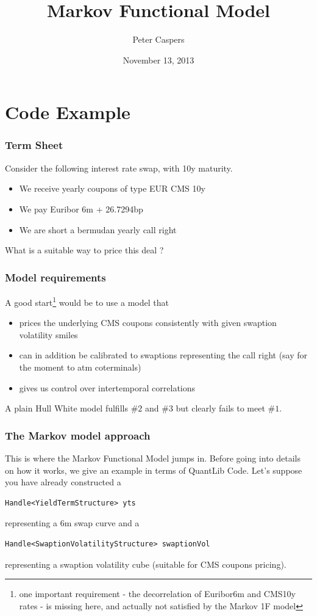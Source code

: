 \documentclass{beamer}
\begin{document}
\title{Markov Functional Model}  
\author{Peter Caspers}
\date{November 13, 2013} 

\frame{\titlepage} 


\section{Code Example}

\begin{frame}
\frametitle{Term Sheet}
Consider the following interest rate swap, with 10y maturity.
\begin{itemize}
\item We receive yearly coupons of type EUR CMS 10y
\item We pay Euribor 6m + 26.7294bp
\item We are short a bermudan yearly call right
\end{itemize}
 What is a suitable way to price this deal ?
\end{frame}


\begin{frame}
\frametitle{Model requirements}
A good start\footnote{one important requirement - the decorrelation of Euribor6m and CMS10y rates - is missing here, and actually not satisfied by the Markov 1F model} would be to use a model that
\begin{itemize}
\item prices the underlying CMS coupons consistently with given swaption volatility smiles
\item can in addition be calibrated to swaptions representing the call right (say for the moment to atm coterminals)
\item gives us control over intertemporal correlations
\end{itemize}
A plain Hull White model fulfills $\#2$ and $\#3$ but clearly fails to meet $\#1$.
\end{frame}



\begin{frame}[fragile]
\frametitle{The Markov model approach}
This is where the Markov Functional Model jumps in. Before going into details on how it works, we give
an example in terms of QuantLib Code. Let's suppose you have already constructed a 
\begin{verbatim}
Handle<YieldTermStructure> yts
\end{verbatim}
representing a 6m swap curve and a 
\begin{verbatim}
Handle<SwaptionVolatilityStructure> swaptionVol
\end{verbatim}
representing a swaption volatility cube (suitable for CMS coupons pricing).
\end{frame}
\end{document}
